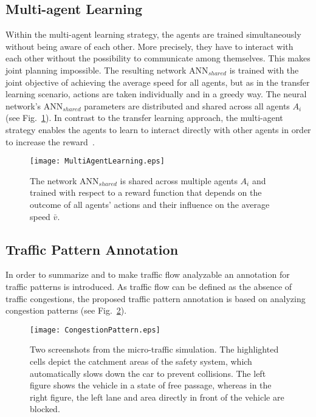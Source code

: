 \documentclass{article}
\begin{document}
\subsection{Multi-agent Learning}
Within the multi-agent learning strategy, the agents are trained simultaneously without being aware of each other. More precisely, they have to interact with each other without the possibility to communicate among themselves.  This makes joint planning impossible. The resulting network ANN$_{shared}$ is trained with the joint objective of achieving the average speed for all agents, but as in the transfer learning scenario, actions are taken individually and in a greedy way. The neural network's ANN$_{shared}$ parameters are distributed and shared across all agents $A_i$ (see Fig.~\ref{fig:MultiAgentLearning}).   In contrast to the transfer learning approach, the multi-agent strategy enables the agents to learn to interact directly with other agents in order to increase the reward~\cite{MULTIAGENT.2012}.   

\begin{figure}[ht]
	\centering
	\texttt{[image: MultiAgentLearning.eps]}
	\caption{The network ANN$_{shared}$ is shared across multiple agents $A_i$ and trained with respect to a reward function that depends on the outcome of all agents' actions and their influence on the average speed $\bar{v}$.}
	\label{fig:MultiAgentLearning}
\end{figure}








\subsection{Traffic Pattern Annotation}
\label{ch:trafficpatternannotation}
In order to summarize and to make traffic flow analyzable an annotation for traffic patterns is introduced. As traffic flow can be defined as the absence of traffic congestions, the proposed traffic pattern annotation is based on analyzing congestion patterns (see Fig.~\ref{fig:CongestionPatternVector}).
\begin{figure}[ht]
	\centering
	\texttt{[image: CongestionPattern.eps]}
	\caption{Two screenshots from the micro-traffic simulation. The highlighted cells depict the catchment areas of the safety system, which automatically slows down the car to prevent collisions. The left figure shows the vehicle in a state of free passage, whereas in the right figure, the left lane and area directly in front of the vehicle are blocked.}
	\label{fig:CongestionPatternVector}
\end{figure}
\end{document}
